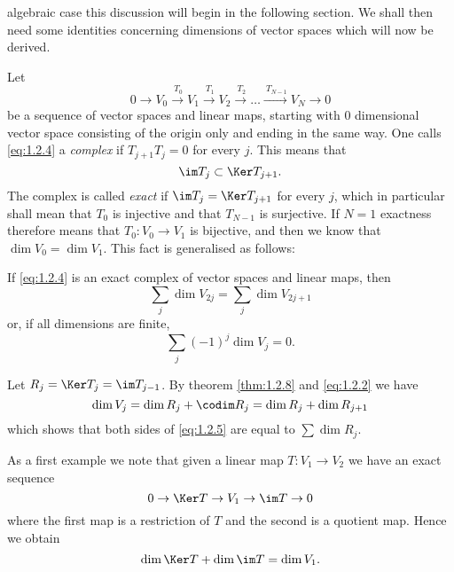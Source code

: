 algebraic case this discussion will begin in the following section. We
shall then need some identities concerning dimensions of vector spaces
which will now be derived.\par
Let
\begin{equation}
  \label{eq:1.2.4}
  0\to V_0\xrightarrow{\ T_0}V_1\xrightarrow{\ T_1}V_2\xrightarrow{\
    T_2}\dots\xrightarrow{\ T_{N-1}}V_N\to0
\end{equation}
be a sequence of vector spaces and linear maps, starting with $0$
dimensional vector space consisting of the origin only and ending in
the same way. One calls \eqref{eq:1.2.4} a \emph{complex} if
$T_{j+1}T_j=0$ for every $j$. This means that
\begin{displaymath}
  \im T_j\subset \Ker T_{j+1}.
\end{displaymath}
The complex is called \emph{exact} if $\im T_j=\Ker T_{j+1}$ for every
$j$, which in particular shall mean that $T_0$ is injective and that
$T_{N-1}$ is surjective. If $N=1$ exactness therefore means that
$T_0:V_0\to V_1$ is bijective, and then we know that $\dim V_0=\dim
V_1$. This fact is generalised as follows:
\begin{thm}
  \label{thm:1.2.10}
  If \eqref{eq:1.2.4} is an exact complex of vector spaces and linear
  maps, then
  \begin{equation}
    \label{eq:1.2.5}
    \sum_j\dim V_{2j}=\sum_j\dim V_{2j+1}
  \end{equation}
or, if all dimensions are finite,
\begin{equation}
  \label{eq:1.2.6}
  \sum_j(-1)^j\dim V_j=0.
\end{equation}
\end{thm}
\begin{prf}
  Let $R_j=\Ker T_j=\im T_{j-1}$. By theorem \ref{thm:1.2.8} and
  \eqref{eq:1.2.2} we have
  \begin{displaymath}
    \dim V_j=\dim R_j+\codim R_j=\dim R_j+\dim R_{j+1}
  \end{displaymath}
which shows that both sides of \eqref{eq:1.2.5} are equal to $\sum\dim
R_j$.
\end{prf}
As a first example we note that given a linear map $T:V_1\to V_2$ we
have an exact sequence
\begin{displaymath}
  0\to\Ker T\to V_1\to\im T\to0
\end{displaymath}
where the first map is a restriction of $T$ and the second is a
quotient map. Hence we obtain
\begin{displaymath}
  \dim\Ker T+\dim\im T=\dim V_1.
\end{displaymath}
